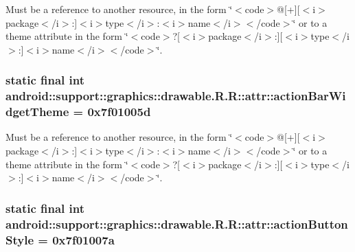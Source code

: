 Must be a reference to another resource, in the form \char`\"{}$<$code$>$@\mbox{[}+\mbox{]}\mbox{[}$<$i$>$package$<$/i$>$:\mbox{]}$<$i$>$type$<$/i$>$:$<$i$>$name$<$/i$>$$<$/code$>$\char`\"{} or to a theme attribute in the form \char`\"{}$<$code$>$?\mbox{[}$<$i$>$package$<$/i$>$:\mbox{]}\mbox{[}$<$i$>$type$<$/i$>$:\mbox{]}$<$i$>$name$<$/i$>$$<$/code$>$\char`\"{}. \hypertarget{classandroid_1_1support_1_1graphics_1_1drawable_1_1_r_1_1attr_1ce84e504387d92e4b262c17ad08e913}{
\subsubsection[{actionBarWidgetTheme}]{\setlength{\rightskip}{0pt plus 5cm}static final int android::support::graphics::drawable.R.R::attr::actionBarWidgetTheme = 0x7f01005d}}
\label{classandroid_1_1support_1_1graphics_1_1drawable_1_1_r_1_1attr_1ce84e504387d92e4b262c17ad08e913}


Must be a reference to another resource, in the form \char`\"{}$<$code$>$@\mbox{[}+\mbox{]}\mbox{[}$<$i$>$package$<$/i$>$:\mbox{]}$<$i$>$type$<$/i$>$:$<$i$>$name$<$/i$>$$<$/code$>$\char`\"{} or to a theme attribute in the form \char`\"{}$<$code$>$?\mbox{[}$<$i$>$package$<$/i$>$:\mbox{]}\mbox{[}$<$i$>$type$<$/i$>$:\mbox{]}$<$i$>$name$<$/i$>$$<$/code$>$\char`\"{}. \hypertarget{classandroid_1_1support_1_1graphics_1_1drawable_1_1_r_1_1attr_4b251ba9857ee7072e47a5b66a1dda01}{
\subsubsection[{actionButtonStyle}]{\setlength{\rightskip}{0pt plus 5cm}static final int android::support::graphics::drawable.R.R::attr::actionButtonStyle = 0x7f01007a}}
\label{classandroid_1_1support_1_1graphics_1_1drawable_1_1_r_1_1attr_4b251ba9857ee7072e47a5b66a1dda01}


